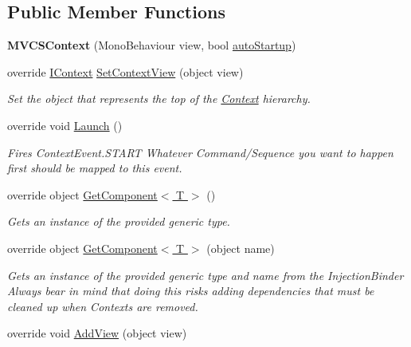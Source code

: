 \subsection*{Public Member Functions}
\begin{DoxyCompactItemize}
\item 
\hypertarget{classstrange_1_1extensions_1_1context_1_1impl_1_1_m_v_c_s_context_a5b6f18989a63526311d714ee84a96afc}{{\bfseries M\-V\-C\-S\-Context} (Mono\-Behaviour view, bool \hyperlink{classstrange_1_1extensions_1_1context_1_1impl_1_1_context_a3386ea2967ba720218b89eaefac77d56}{auto\-Startup})}\label{classstrange_1_1extensions_1_1context_1_1impl_1_1_m_v_c_s_context_a5b6f18989a63526311d714ee84a96afc}

\item 
override \hyperlink{interfacestrange_1_1extensions_1_1context_1_1api_1_1_i_context}{I\-Context} \hyperlink{classstrange_1_1extensions_1_1context_1_1impl_1_1_m_v_c_s_context_aecc258bb5f3d3edd1a3f93ca33a2ce4e}{Set\-Context\-View} (object view)
\begin{DoxyCompactList}\small\item\em Set the object that represents the top of the \hyperlink{classstrange_1_1extensions_1_1context_1_1impl_1_1_context}{Context} hierarchy. \end{DoxyCompactList}\item 
override void \hyperlink{classstrange_1_1extensions_1_1context_1_1impl_1_1_m_v_c_s_context_a70e1400cfb5a71447080acdf79ca93f9}{Launch} ()
\begin{DoxyCompactList}\small\item\em Fires Context\-Event.\-S\-T\-A\-R\-T Whatever Command/\-Sequence you want to happen first should be mapped to this event. \end{DoxyCompactList}\item 
override object \hyperlink{classstrange_1_1extensions_1_1context_1_1impl_1_1_m_v_c_s_context_a094adf14d43505eaa0d5c2c786c2e5f9}{Get\-Component$<$ T $>$} ()
\begin{DoxyCompactList}\small\item\em Gets an instance of the provided generic type. \end{DoxyCompactList}\item 
override object \hyperlink{classstrange_1_1extensions_1_1context_1_1impl_1_1_m_v_c_s_context_a6ea387573cba1bfe0a629dec3d1e6b37}{Get\-Component$<$ T $>$} (object name)
\begin{DoxyCompactList}\small\item\em Gets an instance of the provided generic type and name from the Injection\-Binder Always bear in mind that doing this risks adding dependencies that must be cleaned up when Contexts are removed. \end{DoxyCompactList}\item 
\hypertarget{classstrange_1_1extensions_1_1context_1_1impl_1_1_m_v_c_s_context_ae93688d0d17d6523f11d37c6ffee93a0}{override void \hyperlink{classstrange_1_1extensions_1_1context_1_1impl_1_1_m_v_c_s_context_ae93688d0d17d6523f11d37c6ffee93a0}{Add\-View} (object view)}\label{classstrange_1_1extensions_1_1context_1_1impl_1_1_m_v_c_s_context_ae93688d0d17d6523f11d37c6ffee93a0}


\end{DoxyCompactItemize}
